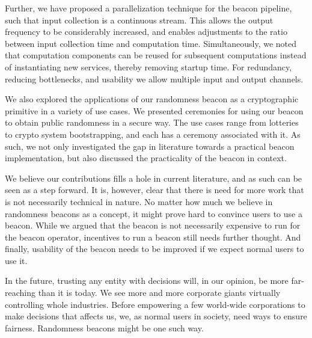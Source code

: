 Further, we have proposed a parallelization technique for the beacon pipeline, such that input collection is a continuous stream.
This allows the output frequency to be considerably increased, and enables adjustments to the ratio between input collection time and computation time.
Simultaneously, we noted that computation components can be reused for subsequent computations instead of instantiating new services, thereby removing startup time. For redundancy, reducing bottlenecks, and usability we allow multiple input and output channels.

We also explored the applications of our randomness beacon as a cryptographic primitive in a variety of use cases.
We presented ceremonies for using our beacon to obtain public randomness in a secure way.
The use cases range from lotteries to crypto system bootstrapping, and each has a ceremony associated with it.
As such, we not only investigated the gap in literature towards a practical beacon implementation, but also discussed the practicality of the beacon in context.

We believe our contributions fills a hole in current literature, and as such can be seen as a step forward. It is, however, clear that there is need for more work that is not necessarily technical in nature. No matter how much we believe in randomness beacons as a concept, it might prove hard to convince users to use a beacon. While we argued that the beacon is not necessarily expensive to run for the beacon operator, incentives to run a beacon still needs further thought. And finally, usability of the beacon needs to be improved if we expect normal users to use it.

In the future, trusting any entity with decisions will, in our opinion, be more far-reaching than it is today. We see more and more corporate giants virtually controlling whole industries. Before empowering a few world-wide corporations to make decisions that affects us, we, as normal users in society, need ways to ensure fairness. Randomness beacons might be one such way.
